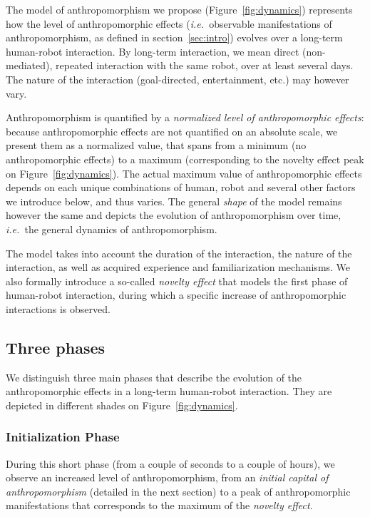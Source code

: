 \documentclass{acm_proc_article-sp}
\newcommand{\ie}{{\textit{i.e.~}}}
\begin{document}
The model of anthropomorphism we propose (Figure~\ref{fig:dynamics}) represents
how the level of anthropomorphic effects (\ie observable manifestations of
anthropomorphism, as defined in section~\ref{sec:intro}) evolves over a
long-term human-robot interaction. By long-term interaction, we mean direct
(non-mediated), repeated interaction with the same robot, over at least several
days. The nature of the interaction (goal-directed, entertainment, etc.) may
however vary.

Anthropomorphism is quantified by a \emph{normalized level of anthropomorphic
effects}: because anthropomorphic effects are not quantified on an absolute
scale, we present them as a normalized value, that spans from a minimum (no
anthropomorphic effects) to a maximum (corresponding to the novelty effect peak
on Figure~\ref{fig:dynamics}). The actual maximum value of anthropomorphic
effects depends on each unique combinations of human, robot and several other
factors we introduce below, and thus varies. The general \emph{shape} of the
model remains however the same and depicts the evolution of anthropomorphism over
time, \ie the general dynamics of anthropomorphism.

The model takes into account the duration of the interaction, the nature of the
interaction, as well as acquired experience and familiarization mechanisms. We
also formally introduce a so-called \emph{novelty effect} that
models the first phase of human-robot interaction, during which a specific
increase of anthropomorphic interactions is observed.

\subsection{Three phases}
\label{sec:phases}

We distinguish three main phases that describe the evolution of the
anthropomorphic effects in a long-term human-robot interaction. They are
depicted in different shades on Figure~\ref{fig:dynamics}.

\subsubsection{Initialization Phase}
\label{sec:initialization}

During this short phase (from a couple
of seconds to a couple of hours), we observe an increased level of
anthropomorphism, from an \emph{initial capital of anthropomorphism}
(detailed in the next section) to a peak of anthropomorphic manifestations
that corresponds to the maximum of the \emph{novelty effect}.
\end{document}
